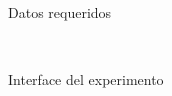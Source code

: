 %

\begin{figure}[ht]
\begin{center}
\\[0pt]
\caption{Datos requeridos}
\label{fig-nacionalidadGenero}
\end{center}
\end{figure}

%


\begin{figure}[ht]
\begin{center}
\\[0pt]
\caption{Interface del experimento}
\label{fig-interface}
\end{center}
\end{figure}


